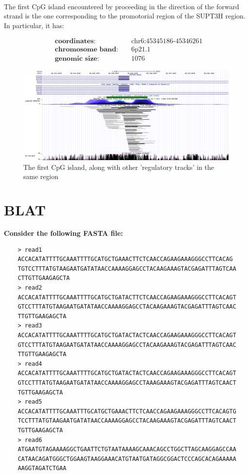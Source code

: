 \documentclass[12pt, a4paper]{article}
\begin{document}
\paragraph{}The first CpG island encountered by proceeding in the direction of the forward strand is the one corresponding to the promotorial region of the SUPT3H region. In particular, it has:%

\begin{align*}
&\textbf{coordinates: } &&\text{chr6:45345186-45346261}\\
&\textbf{chromosome band: } &&\text{6p21.1}\\
&\textbf{genomic size: } && 1076
\end{align*}

\begin{figure}[t]
	\centering
	\includegraphics[width = \textwidth]{CpG_island}
	\caption{The first CpG island, along with other 'regulatory tracks' in the same region}
	\label{CpG island}
\end{figure}

\section{BLAT }

\textbf{Consider the following FASTA file:}

\begin{verbatim}
	> read1
	ACCACATATTTTGCAAATTTTGCATGCTGAAACTTCTCAACCAGAAGAAAGGGCCTTCACAG
	TGTCCTTTATGTAAGAATGATATAACCAAAAGGAGCCTACAAGAAAGTACGAGATTTAGTCAA
	CTTGTTGAAGAGCTA
	> read2
	ACCACATATTTTGCAAATTTTGCATGCTGATACTTCTCAACCAGAAGAAAGGGCCTTCACAGT
	GTCCTTTATGTAAGAATGATATAACCAAAAGGAGCCTACAAGAAAGTACGAGATTTAGTCAAC
	TTGTTGAAGAGCTA
	> read3
	ACCACATATTTTGCAAATTTTGCATGCTGATACTACTCAACCAGAAGAAAGGGCCTTCACAGT
	GTCCTTTATGTAAGAATGATATAACCAAAAGGAGCCTACAAGAAAGTACGAGATTTAGTCAAC
	TTGTTGAAGAGCTA
	> read4
	ACCACATATTTTGCAAATTTTGCATGCTGATACTACTCAACCAGAAGAAAGGGCCTTCACAGT
	GTCCTTTATGTAAGAATGATATAACCAAAAGGAGCCTAAAGAAAGTACGAGATTTAGTCAACT
	TGTTGAAGAGCTA
	> read5
	ACCACATATTTTGCAAATTTGCATGCTGAAACTTCTCAACCAGAAGAAAGGGCCTTCACAGTG
	TCCTTTATGTAAGAATGATATAACCAAAAGGAGCCTACAAGAAAGTACGAGATTTAGTCAACT
	TGTTGAAGAGCTA
	> read6
	ATGAATGTAGAAAAGGCTGAATTCTGTAATAAAAGCAAACAGCCTGGCTTAGCAAGGAGCCAA
	CATAACAGATGGGCTGGAAGTAAGGAAACATGTAATGATAGGCGGACTCCCAGCACAGAAAAA
	AAGGTAGATCTGAA
\end{verbatim}
\end{document}
